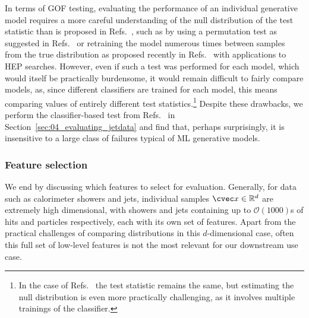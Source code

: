 In terms of GOF testing, evaluating the performance of an individual generative model requires a more careful understanding of the null distribution of the test statistic than is proposed in Refs.~\cite{krause_caloflow, calochallenge}, such as by using a permutation test as suggested in Refs.~\cite{friedman_gof, liu_deepkernels} or retraining the model numerous times between samples from the true distribution as proposed recently in Refs.~\cite{dagnolo_nplm, dagnolo_lmnp} with applications to HEP searches.
However, even if such a test was performed for each model, which would itself be practically burdensome, it would remain difficult to fairly compare models, as, since different classifiers are trained for each model, this means comparing values of entirely different test statistics.\footnote{In the case of Refs.~\cite{dagnolo_nplm, dagnolo_lmnp} the test statistic remains the same, but estimating the null distribution is even more practically challenging, as it involves multiple trainings of the classifier.}
Despite these drawbacks, we perform the classifier-based test from Refs.~\cite{krause_caloflow, calochallenge} in Section~\ref{sec:04_evaluating_jetdata} and find that, perhaps surprisingly, it is insensitive to a large class of failures typical of ML generative models.


\subsubsection{Feature selection}
\label{sec:04_evaluating_feature_selection} 

We end by discussing which features to select for evaluation. 
Generally, for data such as calorimeter showers and jets, individual samples $\cvec x \in \mathbb R^d$ are extremely high dimensional, with showers and jets containing up to $\mathcal{O}(1000)$s of hits and particles respectively, each with its own set of features. 
Apart from the practical challenges of comparing distributions in this $d$-dimensional case, often this full set of low-level features is not the most relevant for our downstream use case.


